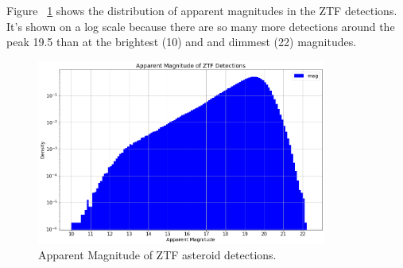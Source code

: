 Figure ~\ref{fig:ZTF_app_mag} shows the distribution of apparent magnitudes in the ZTF detections.
It's shown on a log scale because there are so many more detections around the peak 19.5
than at the brightest (10) and and dimmest (22) magnitudes. 
\begin{figure}[hbt!]
\begin{center}
\includegraphics[width=0.85\textwidth]{../figs/ztf/apparent_mag.png}
\end{center}
\caption[Apparent Magnitude of ZTF asteroid detections]
{Apparent Magnitude of ZTF asteroid detections.}
\label{fig:ZTF_app_mag}
\end{figure}
\clearpage

